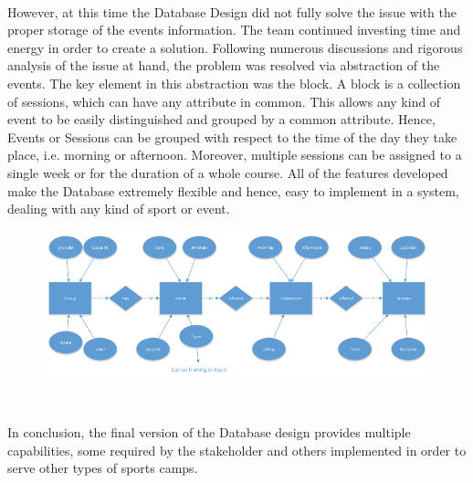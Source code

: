 \documentclass{l3proj}
\begin{document}
\\ However, at this time the Database Design did not fully solve the issue with the proper storage of the events information. The team continued investing time and energy in order to create a solution. Following numerous discussions and rigorous analysis of the issue at hand, the problem was resolved via abstraction of the events. The key element in this abstraction was the block. A block is a collection of sessions, which can have any attribute in common. This allows any kind of event to be easily distinguished and grouped by a common attribute. Hence, Events or Sessions can be grouped with respect to the time of the day they take place, i.e. morning or afternoon. Moreover, multiple sessions can be assigned to a single week or for the duration of a whole course. All of the features developed make the Database extremely flexible and hence, easy to implement in a system, dealing with any kind of sport or event.
\\
{
\begin{figure}[h]
\centering
\includegraphics[scale=0.8]{ERDiagram.png}
\end{figure}
}
\\
\par In conclusion, the final version of the Database design provides multiple capabilities, some required by the stakeholder and others implemented in order to  serve other types of sports camps. \\

\end{document}
